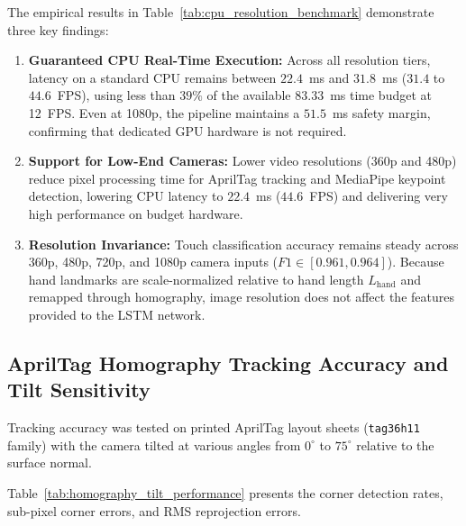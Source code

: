 The empirical results in Table~\ref{tab:cpu_resolution_benchmark} demonstrate three key findings:
\begin{enumerate}
    \item \textbf{Guaranteed CPU Real-Time Execution:} Across all resolution tiers, latency on a standard CPU remains between $22.4$~ms and $31.8$~ms ($31.4$ to $44.6$~FPS), using less than $39\%$ of the available $83.33$~ms time budget at 12~FPS. Even at 1080p, the pipeline maintains a $51.5$~ms safety margin, confirming that dedicated GPU hardware is not required.
    \item \textbf{Support for Low-End Cameras:} Lower video resolutions (360p and 480p) reduce pixel processing time for AprilTag tracking and MediaPipe keypoint detection, lowering CPU latency to $22.4$~ms ($44.6$~FPS) and delivering very high performance on budget hardware.
    \item \textbf{Resolution Invariance:} Touch classification accuracy remains steady across 360p, 480p, 720p, and 1080p camera inputs ($F1 \in [0.961, 0.964]$). Because hand landmarks are scale-normalized relative to hand length $L_{\text{hand}}$ and remapped through homography, image resolution does not affect the features provided to the LSTM network.
\end{enumerate}

\subsection{AprilTag Homography Tracking Accuracy and Tilt Sensitivity}
\label{subsec:test_homography_tilt}
Tracking accuracy was tested on printed AprilTag layout sheets (\texttt{tag36h11} family) with the camera tilted at various angles from $0^\circ$ to $75^\circ$ relative to the surface normal.

Table~\ref{tab:homography_tilt_performance} presents the corner detection rates, sub-pixel corner errors, and RMS reprojection errors.

